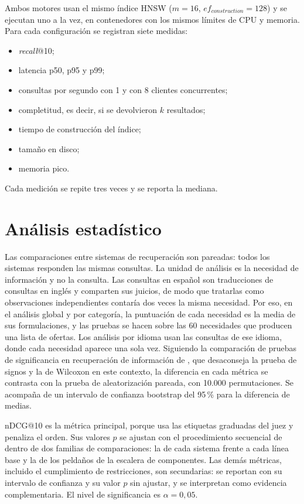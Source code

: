 Ambos motores usan el mismo índice HNSW ($m=16$, $ef_{construction}=128$) y se ejecutan uno a la vez, en contenedores con los mismos límites de CPU y memoria. Para cada configuración se registran siete medidas:
\begin{itemize}
    \item \textit{recall}@10;
    \item latencia p50, p95 y p99;
    \item consultas por segundo con 1 y con 8 clientes concurrentes;
    \item completitud, es decir, si se devolvieron $k$ resultados;
    \item tiempo de construcción del índice;
    \item tamaño en disco;
    \item memoria pico.
\end{itemize}
Cada medición se repite tres veces y se reporta la mediana.

\section{Análisis estadístico}
\label{sec:met-estadistica}

Las comparaciones entre sistemas de recuperación son pareadas: todos los sistemas responden las mismas consultas. La unidad de análisis es la necesidad de información y no la consulta. Las consultas en español son traducciones de consultas en inglés y comparten sus juicios, de modo que tratarlas como observaciones independientes contaría dos veces la misma necesidad. Por eso, en el análisis global y por categoría, la puntuación de cada necesidad es la media de sus formulaciones, y las pruebas se hacen sobre las 60 necesidades que producen una lista de ofertas. Los análisis por idioma usan las consultas de ese idioma, donde cada necesidad aparece una sola vez. Siguiendo la comparación de pruebas de significancia en recuperación de información de \citet{Smucker2007}, que desaconseja la prueba de signos y la de Wilcoxon en este contexto, la diferencia en cada métrica se contrasta con la prueba de aleatorización pareada, con 10.000 permutaciones. Se acompaña de un intervalo de confianza bootstrap del 95\,\% para la diferencia de medias.

nDCG@10 es la métrica principal, porque usa las etiquetas graduadas del juez y penaliza el orden. Sus valores $p$ se ajustan con el procedimiento secuencial de \citet{Holm1979} dentro de dos familias de comparaciones: la de cada sistema frente a cada línea base y la de los peldaños de la escalera de componentes. Las demás métricas, incluido el cumplimiento de restricciones, son secundarias: se reportan con su intervalo de confianza y su valor $p$ sin ajustar, y se interpretan como evidencia complementaria. El nivel de significancia es $\alpha = 0{,}05$.

